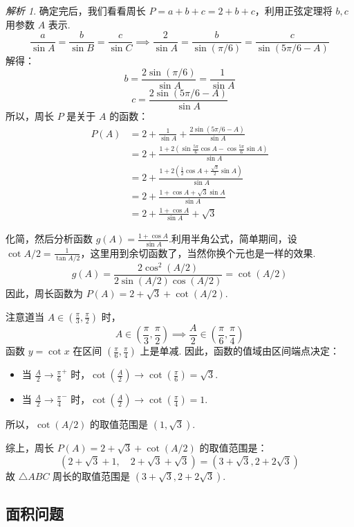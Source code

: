 \documentclass[12pt,a4paper]{ctexbook}
\theoremstyle{definition}
\theoremstyle{remark}
\newtheorem*{solution}{解析}
\begin{document}
\begin{solution}
		确定完后，我们看看周长 $P = a+b+c = 2+b+c$，利用正弦定理将 $b,c$ 用参数 $A$ 表示.
		\[
		\frac{a}{\sin A} = \frac{b}{\sin B} = \frac{c}{\sin C} \implies \frac{2}{\sin A} = \frac{b}{\sin(\pi/6)} = \frac{c}{\sin(5\pi/6 - A)}
		\]
		解得：
		\[
		b = \frac{2\sin(\pi/6)}{\sin A} = \frac{1}{\sin A}
		\]
		\[
		c = \frac{2\sin(5\pi/6 - A)}{\sin A}
		\]
		所以，周长 $P$ 是关于 $A$ 的函数：
		\begin{align*}
			P(A) &= 2 + \frac{1}{\sin A} + \frac{2\sin(5\pi/6 - A)}{\sin A} \\
			&= 2 + \frac{1 + 2\left(\sin\frac{5\pi}{6}\cos A - \cos\frac{5\pi}{6}\sin A\right)}{\sin A} \\
			&= 2 + \frac{1 + 2\left(\frac{1}{2}\cos A + \frac{\sqrt{3}}{2}\sin A\right)}{\sin A} \\
			&= 2 + \frac{1 + \cos A + \sqrt{3}\sin A}{\sin A} \\
			&= 2 + \frac{1+\cos A}{\sin A} + \sqrt{3}
		\end{align*}
		
	化简，然后分析函数 $g(A) = \frac{1+\cos A}{\sin A}$.利用半角公式，简单期间，设$\cot A/2 = \frac{1}{\tan A/2}$，这里用到余切函数了，当然你换个元也是一样的效果.
		\[
		g(A) = \frac{2\cos^2(A/2)}{2\sin(A/2)\cos(A/2)} = \cot(A/2)
		\]
		因此，周长函数为 $P(A) = 2 + \sqrt{3} + \cot(A/2)$.
		
		注意道当 $A \in (\frac{\pi}{3}, \frac{\pi}{2})$ 时，
		\[
		A \in \left(\frac{\pi}{3}, \frac{\pi}{2}\right) \implies \frac{A}{2} \in \left(\frac{\pi}{6}, \frac{\pi}{4}\right)
		\]
		函数 $y = \cot x$ 在区间 $(\frac{\pi}{6}, \frac{\pi}{4})$ 上是单减.
		因此，函数的值域由区间端点决定：
		\begin{itemize}
			\item 当 $\frac{A}{2} \to \frac{\pi}{6}^+$ 时，$\cot(\frac{A}{2}) \to \cot(\frac{\pi}{6}) = \sqrt{3}$.
			\item 当 $\frac{A}{2} \to \frac{\pi}{4}^-$ 时，$\cot(\frac{A}{2}) \to \cot(\frac{\pi}{4}) = 1$.
		\end{itemize}
		所以，$\cot(A/2)$ 的取值范围是 $(1, \sqrt{3})$.
		
		综上，周长 $P(A) = 2+\sqrt{3} + \cot(A/2)$ 的取值范围是：
		\[
		\left(2+\sqrt{3} + 1, \quad 2+\sqrt{3} + \sqrt{3}\right) = \left(3+\sqrt{3}, 2+2\sqrt{3}\right)
		\]
		故 $\triangle ABC$ 周长的取值范围是 $(3+\sqrt{3}, 2+2\sqrt{3})$.\hfill\qedsymbol
	\end{solution}
	
	\subsection{面积问题}
\end{document}
